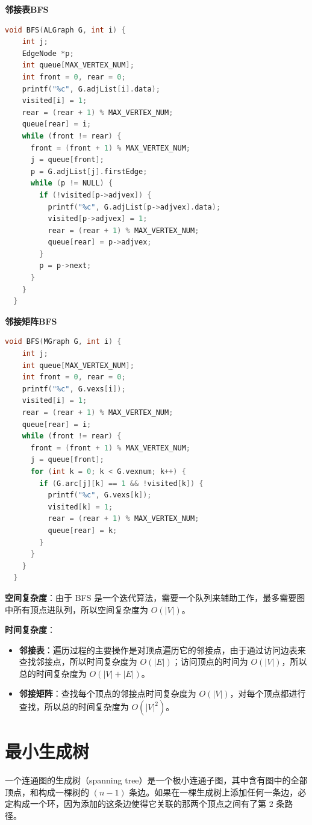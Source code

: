 \documentclass[lang=cn,newtx,10pt,scheme=chinese]{../elegantbook}
\begin{document}
\textbf{邻接表BFS}

\begin{lstlisting}[language=C++, caption={邻接表BFS}]
  void BFS(ALGraph G, int i) {
    int j;
    EdgeNode *p;
    int queue[MAX_VERTEX_NUM];
    int front = 0, rear = 0;
    printf("%c", G.adjList[i].data);
    visited[i] = 1;
    rear = (rear + 1) % MAX_VERTEX_NUM;
    queue[rear] = i;
    while (front != rear) {
      front = (front + 1) % MAX_VERTEX_NUM;
      j = queue[front];
      p = G.adjList[j].firstEdge;
      while (p != NULL) {
        if (!visited[p->adjvex]) {
          printf("%c", G.adjList[p->adjvex].data);
          visited[p->adjvex] = 1;
          rear = (rear + 1) % MAX_VERTEX_NUM;
          queue[rear] = p->adjvex;
        }
        p = p->next;
      }
    }
  }

\end{lstlisting}

\textbf{邻接矩阵BFS}

\begin{lstlisting}[language=C++, caption={邻接矩阵BFS}]
  void BFS(MGraph G, int i) {
    int j;
    int queue[MAX_VERTEX_NUM];
    int front = 0, rear = 0;
    printf("%c", G.vexs[i]);
    visited[i] = 1;
    rear = (rear + 1) % MAX_VERTEX_NUM;
    queue[rear] = i;
    while (front != rear) {
      front = (front + 1) % MAX_VERTEX_NUM;
      j = queue[front];
      for (int k = 0; k < G.vexnum; k++) {
        if (G.arc[j][k] == 1 && !visited[k]) {
          printf("%c", G.vexs[k]);
          visited[k] = 1;
          rear = (rear + 1) % MAX_VERTEX_NUM;
          queue[rear] = k;
        }
      }
    }
  }
\end{lstlisting}

\textbf{空间复杂度}：由于 BFS 是一个迭代算法，需要一个队列来辅助工作，最多需要图中所有顶点进队列，所以空间复杂度为 $O(|V|)$。

\textbf{时间复杂度}：

\begin{itemize}
  \item \textbf{邻接表}：遍历过程的主要操作是对顶点遍历它的邻接点，由于通过访问边表来查找邻接点，所以时间复杂度为 $O(|E|)$；访问顶点的时间为 $O(|V|)$，所以总的时间复杂度为 $O(|V| + |E|)$。
  \item \textbf{邻接矩阵}：查找每个顶点的邻接点时间复杂度为 $O(|V|)$，对每个顶点都进行查找，所以总的时间复杂度为 $O(|V|^2)$。
  \end{itemize}

\section{最小生成树}
一个连通图的生成树（spanning tree）是一个极小连通子图，其中含有图中的全部顶点，和构成一棵树的 $(n-1)$ 条边。如果在一棵生成树上添加任何一条边，必定构成一个环，因为添加的这条边使得它关联的那两个顶点之间有了第 2 条路径。
\end{document}
